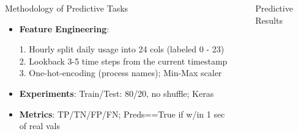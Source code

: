 \documentclass[final]{beamer}
\newlength{\sepwidth}
\newlength{\colwidth}
\newcommand{\separatorcolumn}{\begin{column}{\sepwidth}\end{column}}
\begin{document}
\begin{frame}[t]
\begin{columns}[t]
\begin{column}{\colwidth}
\begin{exampleblock}{\huge{Methodology of Predictive Tasks}}
{\begin{itemize}
            \item \textbf{Feature Engineering}:

                  1. Hourly split daily usage into 24 cols (labeled 0 - 23)\\
                  2. Lookback 3-5 time steps from the current timestamp\\
                  3. One-hot-encoding (process names); Min-Max scaler
            \item \textbf{Experiments}: Train/Test: 80/20, no shuffle; Keras

                 \item \textbf{Metrics}: TP/TN/FP/FN; Preds==True if w/in 1 sec of real vals

          \end{itemize} }
      \end{exampleblock}

    \end{column}

    \separatorcolumn

    \begin{column}{\colwidth}

      \begin{block}
        {\hspace*{2cm} \huge{Predictive Results}}


\end{block}
\end{column}
\end{columns}
\end{frame}
\end{document}
